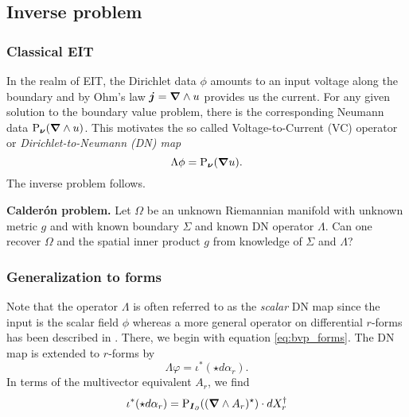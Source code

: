 \subsection{Inverse problem}

\subsubsection{Classical EIT}
In the realm of EIT, the Dirichlet data $\phi$ amounts to an input voltage along the boundary and by Ohm's law $\boldsymbol{j}=\boldsymbol{\nabla} \wedge u$ provides us the current. For any given solution to the boundary value problem, there is the corresponding Neumann data $\operatorname{P}_{\boldsymbol{\nu}}(\boldsymbol{\nabla} \wedge u)$. This motivates the so called Voltage-to-Current (VC) operator or  \emph{Dirichlet-to-Neumann (DN) map}
\begin{equation}
\label{eq:classical_dn_map}
\Lambda \phi = \operatorname{P}_{\boldsymbol{\nu}}(\boldsymbol{\nabla} u).
\end{equation}
The inverse problem follows.

\vspace*{5pt}
\noindent\textbf{Calder\'on problem.} Let $\Omega$ be an unknown Riemannian manifold with unknown metric $g$ and with known boundary $\Sigma$ and known DN operator $\Lambda$. Can one recover $\Omega$ and the spatial inner product $g$ from knowledge of $\Sigma$ and $\Lambda$?
\vspace*{5pt}

\subsubsection{Generalization to forms}

Note that the operator $\Lambda$ is often referred to as the \emph{scalar} DN map since the input is the scalar field $\phi$ whereas a more general operator on differential $r$-forms has been described in \cite{belishev_dirichlet_2008,sharafutdinov_complete_2013}. There, we begin with equation \cref{eq:bvp_forms}. The DN map is extended to $r$-forms by
\begin{equation}
\Lambda \varphi = \iota^* (\star d \alpha_r).
\end{equation}
In terms of the multivector equivalent $A_r$, we find
\begin{equation}
\iota^*(\star d \alpha_r) = \operatorname{P}_{\boldsymbol{I}_\partial} ((\boldsymbol{\nabla} \wedge A_r)^\star )\cdot dX_{r}^\dagger
\end{equation}


